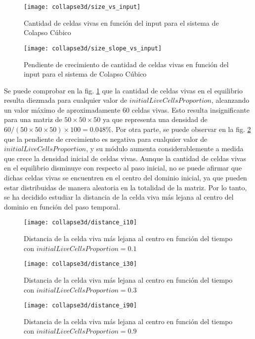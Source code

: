 \begin{figure}[H]
    \centering
    \texttt{[image: collapse3d/size\_vs\_input]}
    \caption{Cantidad de celdas vivas en función del input para el sistema de Colapso Cúbico}
    \label{fig:colapso3d_size_vs_input}
\end{figure}
\begin{figure}[H]
    \centering
    \texttt{[image: collapse3d/size\_slope\_vs\_input]}
    \caption{Pendiente de crecimiento de cantidad de celdas vivas en función del input para el sistema de Colapso Cúbico}
    \label{fig:colapso3d_size_slope_vs_input}
\end{figure}

Se puede comprobar en la fig. \ref{fig:colapso3d_size_vs_input} que la cantidad de celdas vivas en el equilibrio
resulta diezmada para cualquier valor de $initialLiveCellsProportion$, alcanzando un valor máximo de aproximadamente
60 celdas vivas.
Esto resulta insignificante para una matriz de $50 \times 50 \times 50$ ya que representa una densidad
de $60/(50 \times 50 \times 50) \times 100 = 0.048\%$.
Por otra parte, se puede observar en la fig. \ref{fig:colapso3d_size_slope_vs_input} que la pendiente de
crecimiento es negativa para cualquier valor de $initialLiveCellsProportion$, y su módulo aumenta
considerablemente a medida que crece la densidad inicial de celdas vivas.
Aunque la cantidad de celdas vivas en el equilibrio disminuye con respecto al paso inicial, no se puede afirmar
que dichas celdas vivas se encuentren en el centro del dominio inicial, ya que pueden estar distribuidas de manera
aleatoria en la totalidad de la matriz.
Por lo tanto, se ha decidido estudiar la distancia de la celda viva más lejana al centro del dominio en función del
paso temporal.

\begin{figure}[H]
    \centering
    \texttt{[image: collapse3d/distance\_i10]}
    \caption{Distancia de la celda viva más lejana al centro en función del tiempo con $initialLiveCellsProportion = 0.1$}
    \label{fig:colapso3d_d10}
\end{figure}
\begin{figure}[H]
    \centering
    \texttt{[image: collapse3d/distance\_i30]}
    \caption{Distancia de la celda viva más lejana al centro en función del tiempo con $initialLiveCellsProportion = 0.3$}
    \label{fig:colapso3d_d30}
\end{figure}
\begin{figure}[H]
    \centering
    \texttt{[image: collapse3d/distance\_i90]}
    \caption{Distancia de la celda viva más lejana al centro en función del tiempo con $initialLiveCellsProportion = 0.9$}
    \label{fig:colapso3d_d90}
\end{figure}

